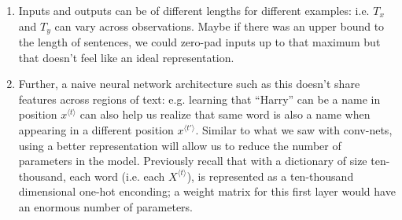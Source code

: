 \documentclass[12pt]{article}
\begin{document}
\begin{enumerate}
  \item Inputs and outputs can be of different lengths for different examples: i.e. $T_x$ and $T_y$ can vary across observations. Maybe if there was an upper bound to the length of sentences, we could zero-pad inputs up to that maximum but that doesn't feel like an ideal representation.
\item Further, a naive neural network architecture such as this doesn't share features across regions of text: e.g. learning that ``Harry'' can be a name in position $x^{\langle t\rangle}$ can also help us realize that same word is also a name when appearing in a different position $x^{\langle t'\rangle}$. Similar to what we saw with conv-nets, using a better representation will allow us to reduce the number of parameters in the model. Previously recall that with a dictionary of size ten-thousand, each word (i.e. each $X^{\langle t \rangle}$), is represented as a ten-thousand dimensional one-hot enconding; a weight matrix for this first layer would have an enormous number of parameters.
\end{enumerate}
\end{document}
